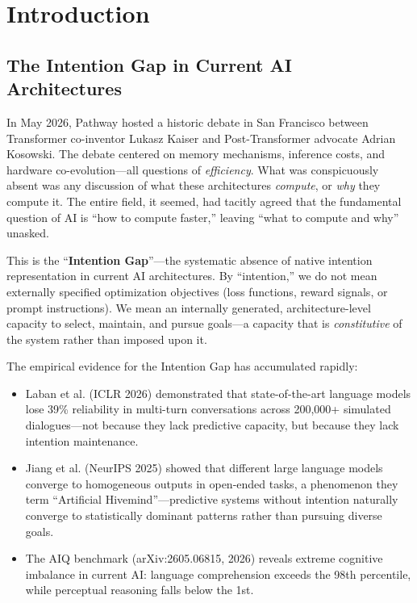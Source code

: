 \documentclass[11pt,a4paper]{article}
\theoremstyle{definition}
\theoremstyle{remark}
\begin{document}
\tableofcontents
\newpage

\section{Introduction}\label{sec:introduction}

\subsection{The Intention Gap in Current AI Architectures}\label{subsec:intention-gap}

In May 2026, Pathway hosted a historic debate in San Francisco between Transformer co-inventor Lukasz Kaiser and Post-Transformer advocate Adrian Kosowski. The debate centered on memory mechanisms, inference costs, and hardware co-evolution---all questions of \textit{efficiency}. What was conspicuously absent was any discussion of what these architectures \textit{compute}, or \textit{why} they compute it. The entire field, it seemed, had tacitly agreed that the fundamental question of AI is ``how to compute faster,'' leaving ``what to compute and why'' unasked.

This is the ``\textbf{Intention Gap}''---the systematic absence of native intention representation in current AI architectures. By ``intention,'' we do not mean externally specified optimization objectives (loss functions, reward signals, or prompt instructions). We mean an internally generated, architecture-level capacity to select, maintain, and pursue goals---a capacity that is \textit{constitutive} of the system rather than imposed upon it.

The empirical evidence for the Intention Gap has accumulated rapidly:
\begin{itemize}
    \item Laban et al. (ICLR 2026) demonstrated that state-of-the-art language models lose 39\% reliability in multi-turn conversations across 200,000+ simulated dialogues---not because they lack predictive capacity, but because they lack intention maintenance.
    \item Jiang et al. (NeurIPS 2025) showed that different large language models converge to homogeneous outputs in open-ended tasks, a phenomenon they term ``Artificial Hivemind''---predictive systems without intention naturally converge to statistically dominant patterns rather than pursuing diverse goals.
    \item The AIQ benchmark (arXiv:2605.06815, 2026) reveals extreme cognitive imbalance in current AI: language comprehension exceeds the 98th percentile, while perceptual reasoning falls below the 1st.
\end{itemize}
\end{document}

